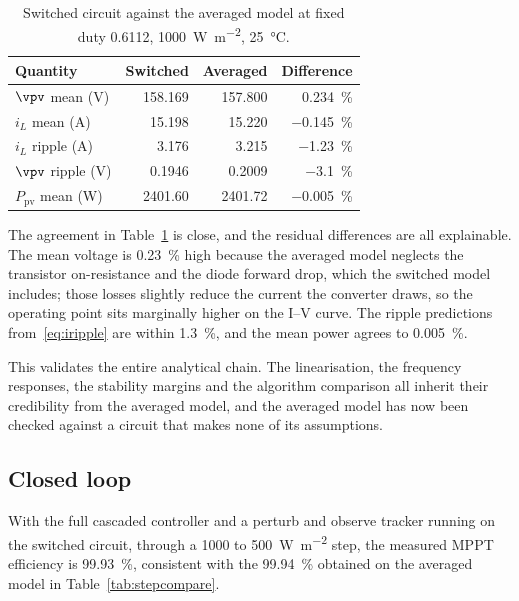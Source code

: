 \begin{table}[htbp]
\centering
\caption{Switched circuit against the averaged model at fixed duty \num{0.6112}, \SI{1000}{\watt\per\square\metre}, \SI{25}{\celsius}.}
\label{tab:swvalid}
\begin{tabular}{@{}lrrr@{}}
\toprule
\textbf{Quantity} & \textbf{Switched} & \textbf{Averaged} & \textbf{Difference} \\
\midrule
$\vpv$ mean (\si{\volt})            & 158.169 & 157.800 & \SI{+0.234}{\percent} \\
$i_L$ mean (\si{\ampere})           & 15.198  & 15.220  & \SI{-0.145}{\percent} \\
$i_L$ ripple (\si{\ampere})         & 3.176   & 3.215   & \SI{-1.23}{\percent} \\
$\vpv$ ripple (\si{\volt})          & 0.1946  & 0.2009  & \SI{-3.1}{\percent} \\
$P_{\mathrm{pv}}$ mean (\si{\watt}) & 2401.60 & 2401.72 & \SI{-0.005}{\percent} \\
\bottomrule
\end{tabular}
\end{table}

The agreement in Table~\ref{tab:swvalid} is close, and the residual differences
are all explainable. The mean voltage is \SI{0.23}{\percent} high because the
averaged model neglects the transistor on-resistance and the diode forward drop,
which the switched model includes; those losses slightly reduce the current the
converter draws, so the operating point sits marginally higher on the I--V
curve. The ripple predictions from~\eqref{eq:iripple} are within
\SI{1.3}{\percent}, and the mean power agrees to \SI{0.005}{\percent}.

This validates the entire analytical chain. The linearisation, the frequency
responses, the stability margins and the algorithm comparison all inherit their
credibility from the averaged model, and the averaged model has now been checked
against a circuit that makes none of its assumptions.

\subsection{Closed loop}

With the full cascaded controller and a perturb and observe tracker running on
the switched circuit, through a \SI{1000}{} to \SI{500}{\watt\per\square\metre}
step, the measured MPPT efficiency is \SI{99.93}{\percent}, consistent with the
\SI{99.94}{\percent} obtained on the averaged model in
Table~\ref{tab:stepcompare}.

